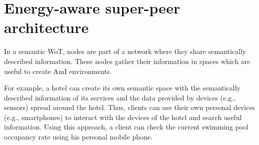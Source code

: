 \section{Energy-aware super-peer architecture} %
\label{proposal}




In a semantic WoT, nodes are part of a network where they share semantically described information.
These nodes gather their information in spaces which are useful to create AmI environments.

For example, a hotel can create its own semantic space with the semantically described information of its services and the data provided by devices (e.g., sensors) spread around the hotel.
Thus, clients can use their own personal devices (e.g., smartphones) to interact with the devices of the hotel and search useful information.
Using this approach, a client can check the current swimming pool occupancy rate using his personal mobile phone.

